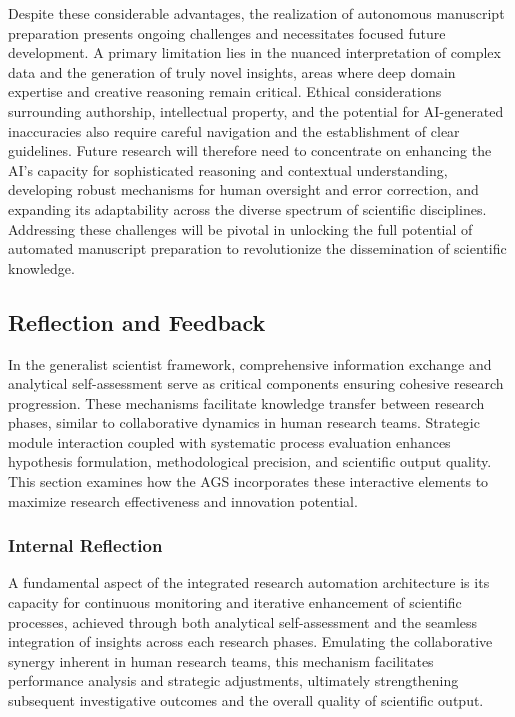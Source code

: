 Despite these considerable advantages, the realization of autonomous manuscript preparation presents ongoing challenges and necessitates focused future development. A primary limitation lies in the nuanced interpretation of complex data and the generation of truly novel insights, areas where deep domain expertise and creative reasoning remain critical. Ethical considerations surrounding authorship, intellectual property, and the potential for AI-generated inaccuracies also require careful navigation and the establishment of clear guidelines. Future research will therefore need to concentrate on enhancing the AI's capacity for sophisticated reasoning and contextual understanding, developing robust mechanisms for human oversight and error correction, and expanding its adaptability across the diverse spectrum of scientific disciplines. Addressing these challenges will be pivotal in unlocking the full potential of automated manuscript preparation to revolutionize the dissemination of scientific knowledge.






\subsection*{Reflection and Feedback}

In the generalist scientist framework, comprehensive information exchange and analytical self-assessment serve as critical components ensuring cohesive research progression. These mechanisms facilitate knowledge transfer between research phases, similar to collaborative dynamics in human research teams. Strategic module interaction coupled with systematic process evaluation enhances hypothesis formulation, methodological precision, and scientific output quality. This section examines how the AGS incorporates these interactive elements to maximize research effectiveness and innovation potential.

\subsubsection*{Internal Reflection}

A fundamental aspect of the integrated research automation architecture is its capacity for continuous monitoring and iterative enhancement of scientific processes, achieved through both analytical self-assessment and the seamless integration of insights across each research phases. Emulating the collaborative synergy inherent in human research teams, this mechanism facilitates performance analysis and strategic adjustments, ultimately strengthening subsequent investigative outcomes and the overall quality of scientific output.

